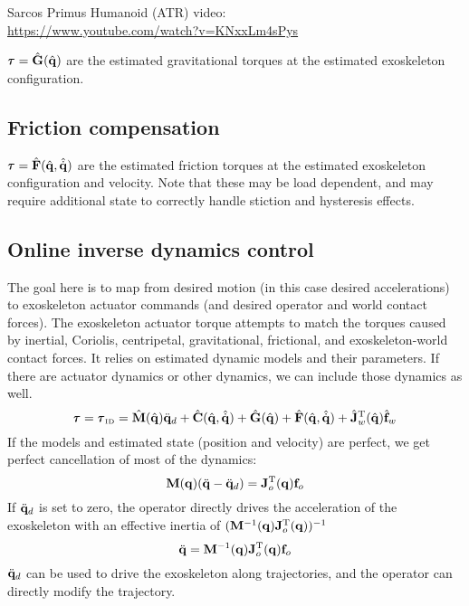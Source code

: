 \documentclass[letterpaper,12pt,fullpage]{article}
\newcommand{\invdyn}{{\mbox {\tiny ID}}}
\begin{document}
Sarcos Primus Humanoid (ATR) video:\\
\url{https://www.youtube.com/watch?v=KNxxLm4sPys}

$\vtau = \hat{\mG}(\hat{\vq})$ 
are the estimated gravitational torques at the estimated exoskeleton configuration.

\subsection{Friction compensation}

$\vtau = \hat{\mF}(\hat{\vq},\hat{\dot{\vq}})$ 
are the estimated friction torques at the estimated exoskeleton configuration
and velocity.
Note that these may be load dependent, and may require additional state to
correctly handle stiction and hysteresis effects.

\subsection{Online inverse dynamics control}

The goal here is to map from desired motion (in this case desired
accelerations) to exoskeleton actuator commands (and desired operator
and world contact forces).
The exoskeleton actuator torque 
attempts to match the torques caused by inertial, Coriolis, centripetal,
gravitational, frictional, and exoskeleton-world contact forces.
It relies on estimated dynamic models and their parameters.
If there are actuator dynamics or other dynamics, we can include those
dynamics as well.
\begin{equation}
\vtau = \vtau_{\invdyn} 
= \hat{\mM}(\hat{\vq}) \ddot{\vq}_d
+ \hat{\mC}(\hat{\vq},\hat{\dot{\vq}})
+ \hat{\mG}(\hat{\vq})
+ \hat{\mF}(\hat{\vq},\hat{\dot{\vq}})
+ \hat{\mJ}_w^{\tr}(\hat{\vq}) \hat{\vf}_w
\end{equation}
If the models and estimated state (position and velocity) are perfect, we get
perfect cancellation of most of the dynamics:
\begin{equation}
{\bf M}({\bf q}) (\ddot{{\bf q}} - \ddot{{\bf q}}_d) = {\bf J}_o^{{\rm T}}({\bf q}) {\bf f}_o
\end{equation}
If $\ddot{{\bf q}}_d$ is set to zero, the operator directly drives the acceleration
of the exoskeleton with an effective inertia of $({\bf M}^{-1}({\bf q}) {\bf J}_o^{{\rm T}}({\bf q}))^{-1}$
\begin{equation}
\ddot{{\bf q}} = {\bf M}^{-1}({\bf q}) {\bf J}_o^{{\rm T}}({\bf q}) {\bf f}_o
\label{eq:cancel}
\end{equation}
$\ddot{{\bf q}}_d$ can be used to drive the exoskeleton along trajectories, and
the operator can directly modify the trajectory.
\end{document}
